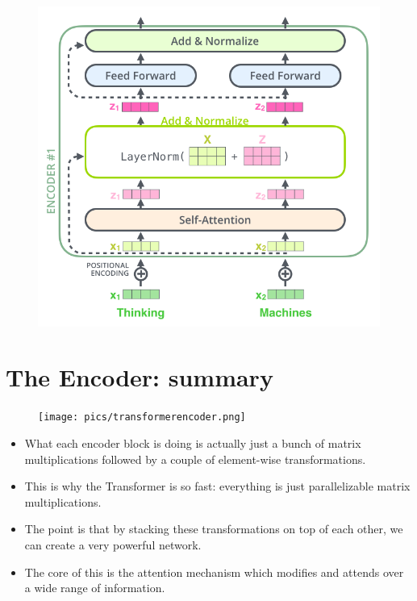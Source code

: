  \begin{figure}[h]
        	\includegraphics[scale = 0.3]{pics/transformer_resideual_layer_norm_2.png}
        \end{figure}


\section{The Encoder: summary}

     \begin{figure}[h]
        	\texttt{[image: pics/transformerencoder.png]}
        \end{figure}  
\begin{itemize}

 \item  What each encoder block is doing is actually just a bunch of matrix multiplications followed by a couple of element-wise transformations.

 \item This is why the Transformer is so fast: everything is just parallelizable matrix multiplications.

 \item The point is that by stacking these transformations on top of each other, we can create a very powerful network.

 \item The core of this is the attention mechanism which modifies and attends over a wide range of information.

\end{itemize}



